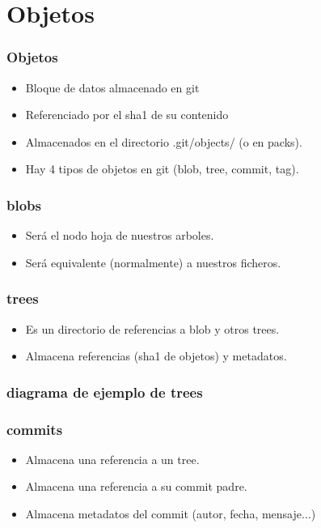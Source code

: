\documentclass[10pt]{beamer}
\begin{document}
  \section*{Objetos}

  \begin{frame}
    \frametitle{Objetos}
    \begin{itemize}
        \item Bloque de datos almacenado en git
        \item Referenciado por el sha1 de su contenido
        \item Almacenados en el directorio .git/objects/ (o en packs).
        \item Hay 4 tipos de objetos en git (blob, tree, commit, tag).
    \end{itemize}
  \end{frame}

  \begin{frame}
    \frametitle{blobs}
    \begin{itemize}
        \item Será el nodo hoja de nuestros arboles.
        \item Será equivalente (normalmente) a nuestros ficheros.
    \end{itemize}
  \end{frame}

  \begin{frame}
    \frametitle{trees}
    \begin{itemize}
        \item Es un directorio de referencias a blob y otros trees.
        \item Almacena referencias (sha1 de objetos) y metadatos.
    \end{itemize}
  \end{frame}

  \begin{frame}
    \frametitle{diagrama de ejemplo de trees}
  \end{frame}

  \begin{frame}
    \frametitle{commits}
    \begin{itemize}
        \item Almacena una referencia a un tree.
        \item Almacena una referencia a su commit padre.
        \item Almacena metadatos del commit (autor, fecha, mensaje...)
    \end{itemize}
  \end{frame}
\end{document}
